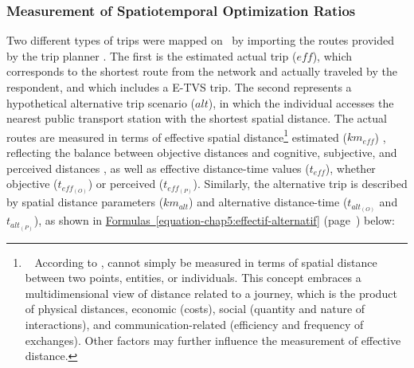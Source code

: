 \begin{refsegment}
\subsubsection*{Measurement of Spatiotemporal Optimization Ratios
    \label{chap5:calcul-ratio-optimisation}
}

Two different types of trips were mapped on ~by importing the routes provided by the trip planner . The first is the estimated actual trip (\(eff\)), which corresponds to the shortest route from the network and actually traveled by the respondent, and which includes a \acrshort{E-TVS} trip. The second represents a hypothetical alternative trip scenario (\(alt\)), in which the individual accesses the nearest public transport station with the shortest spatial distance. The actual routes are measured in terms of effective spatial distance\footnote{~
    According to \textcolor{blue}{\textcite[308]{deutsch_note_1961}},  cannot simply be measured in terms of spatial distance between two points, entities, or individuals. This concept embraces a multidimensional view of distance related to a journey, which is the product of physical distances, economic (costs), social (quantity and nature of interactions), and communication-related (efficiency and frequency of exchanges). Other factors may further influence the measurement of effective distance.
} estimated (\(km_{eff}\)) \textcolor{blue}{\autocite[34]{cauvin-reymond_perception_1984}}, reflecting the balance between objective distances \textcolor{blue}{\autocite{brigss_methodologies_1976}} and cognitive, subjective, and perceived distances \textcolor{blue}{\autocite{canter_psychology_1977, bailly_perception_1977, sadalla_perception_1980}}, as well as effective distance-time values (\(t_{eff}\)), whether objective (\(t_{eff_{(O)}}\)) or perceived (\(t_{eff_{(P)}}\)). Similarly, the alternative trip is described by spatial distance parameters (\(km_{alt}\)) and alternative distance-time (\(t_{alt_{(O)}}\) and \(t_{alt_{(P)}}\)), as shown in \hyperref[equation-chap5:effectif-alternatif]{Formulas~\ref{equation-chap5:effectif-alternatif}} (page~\pageref{equation-chap5:effectif-alternatif}) below:%


\end{refsegment}
